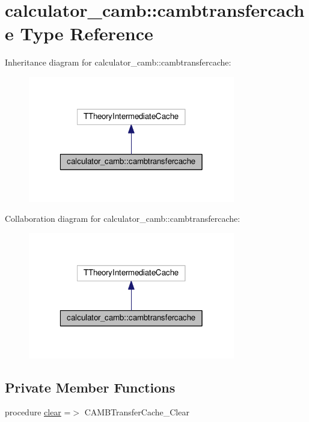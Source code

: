 \hypertarget{structcalculator__camb_1_1cambtransfercache}{}\section{calculator\+\_\+camb\+:\+:cambtransfercache Type Reference}
\label{structcalculator__camb_1_1cambtransfercache}


Inheritance diagram for calculator\+\_\+camb\+:\+:cambtransfercache\+:
\nopagebreak
\begin{figure}[H]
\begin{center}
\leavevmode
\includegraphics[width=256pt]{structcalculator__camb_1_1cambtransfercache__inherit__graph}
\end{center}
\end{figure}


Collaboration diagram for calculator\+\_\+camb\+:\+:cambtransfercache\+:
\nopagebreak
\begin{figure}[H]
\begin{center}
\leavevmode
\includegraphics[width=256pt]{structcalculator__camb_1_1cambtransfercache__coll__graph}
\end{center}
\end{figure}
\subsection*{Private Member Functions}
\begin{DoxyCompactItemize}
\item 
procedure \mbox{\hyperlink{structcalculator__camb_1_1cambtransfercache_a39eb7240d0ac81b29faf7c27776b0b0c}{clear}} =$>$ C\+A\+M\+B\+Transfer\+Cache\+\_\+\+Clear
\end{DoxyCompactItemize}
